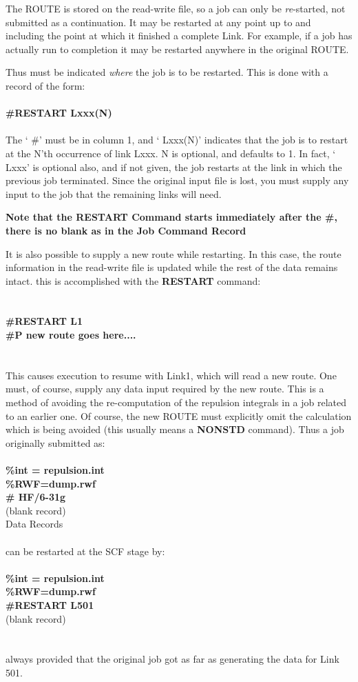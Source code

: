 The ROUTE is stored on the read-write file, so a job can only be 
{\em re}-started, not submitted as a continuation. 
It may be restarted at any point up to and including
the point at which it finished a complete Link. For example,
if a job has actually run to completion it may be restarted anywhere 
in the original ROUTE.

Thus must be indicated {\em where} the job  is to be restarted.  
This is done
with a record of the form:  \\
\ \\
{\bf \#RESTART Lxxx(N)}  \\
\ \\
The ` \#' must be in column 1, and ` Lxxx(N)' 
indicates that the job is to
restart at the N'th occurrence of link Lxxx. N is optional, and defaults
to 1. In fact, ` Lxxx' is optional also, and if not given, the job
restarts at the link in which the previous job terminated. Since the
original input  file is lost, you must supply any input to the job that
the remaining links will need. 

{\bf Note that the RESTART Command starts immediately after the \#,
there is no blank as in the Job Command Record}

It is also possible to supply  a new
route while  restarting.  In this case, the route information in the
read-write file is updated while the  rest of the data remains intact.
this is accomplished with the {\bf  RESTART} command:  \\
\ \\
\ \\
{\bf \#RESTART L1  \\
\#P new route goes here....}  \\
\ \\
\ \\
This causes execution to resume with Link1, which will read a new
route. One must, of course, supply any data input required by the new
route. This is a method of avoiding the re-computation of the
repulsion integrals in a job related to an earlier one. Of course,
the new ROUTE must explicitly omit the calculation which is being
avoided (this usually means a {\bf NONSTD} command).
\newpage
Thus a job originally submitted as: \\
\ \\
{\bf \%int = repulsion.int} \\
{\bf \%RWF=dump.rwf} \\
{\bf \# HF/6-31g} \\
(blank record) \\
Data Records \\
\ \\
can be restarted at the SCF stage by: \\
\ \\
{\bf \%int = repulsion.int} \\
{\bf \%RWF=dump.rwf} \\
{\bf \#RESTART L501} \\
(blank record) \\
\ \\
\ \\
always provided that the original job got as far as generating the
data for Link 501.
